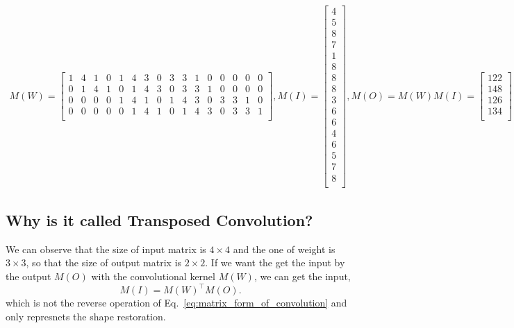 \documentclass[10pt,onecolumn]{book}
\begin{document}
\begin{equation}\label{eq:matrix_form_of_convolution}
\begin{split}
M(W) = \left[
	\begin{matrix}
	1 & 4 & 1 & 0 & 1 & 4 & 3 & 0 & 3 & 3 & 1 & 0 & 0 & 0 & 0 & 0 \\
	0 & 1 & 4 & 1 & 0 & 1 & 4 & 3 & 0 & 3 & 3 & 1 & 0 & 0 & 0 & 0 \\
	0 & 0 & 0 & 0 & 1 & 4 & 1 & 0 & 1 & 4 & 3 & 0 & 3 & 3 & 1 & 0 \\
	0 & 0 & 0 & 0 & 0 & 1 & 4 & 1 & 0 & 1 & 4 & 3 & 0 & 3 & 3 & 1 \\
	\end{matrix}
	\right],
M(I) = \left[
	\begin{matrix}
	4 \\
	5\\
	8\\
	7\\
	1\\
	8\\
	8\\
	8\\
	3\\
	6\\
	6\\
	4\\
	6\\
	5\\
	7\\
	8\\
	\end{matrix}
	\right], 
M(O) = M(W) M(I) = \left[
		\begin{matrix}
		122 \\
		148 \\
		126 \\
		134 \\
		\end{matrix}
		\right]
\end{split}
\end{equation}

\subsection{Why is it called Transposed Convolution?}
We can observe that the size of input matrix is $4 \times 4$ and the one of weight is $3 \times 3$, so that the size of output matrix is $2 \times 2$. If we want the get the input by the output $M(O)$ with the convolutional kernel $M(W)$, we can get the input, 
\begin{equation}
M(I) = M(W)^\top M(O).
\end{equation}
which is not the reverse operation of Eq.~\ref{eq:matrix_form_of_convolution} and only represnets the shape restoration.
\end{document}
